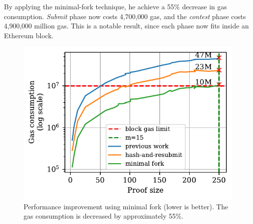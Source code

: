 By applying the minimal-fork technique, he achieve a 55\% decrease in gas
consumption. \emph{Submit} phase now costs {4{,}700{,}000} gas, and
the \emph{contest} phase costs {4{,}900{,}000} million gas. This is a notable
result, since each phase now fits inside an Ethereum block.



\begin{figure}[h]
    \begin{center}
        \includegraphics[width=1\columnwidth]{figures/minimal-fork.pdf}
    \end{center}
\vspace*{-5mm}
    \caption{Performance improvement using minimal fork (lower is better). The
        gas consumption is decreased by approximately 55\%.}
    \label{fig:minimal-fork}
\vspace*{-5mm}
\end{figure}
